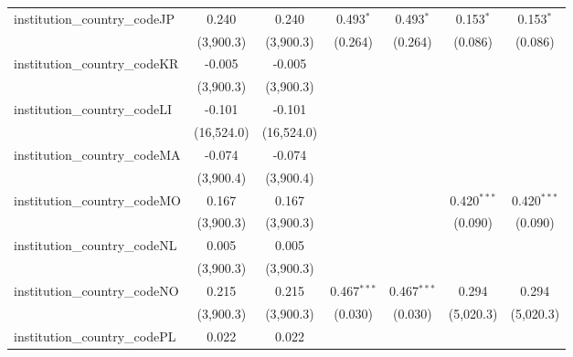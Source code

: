 \begin{tabular}{lcccccc}
   institution\_country\_codeJP          & 0.240          & 0.240          & 0.493$^{*}$   & 0.493$^{*}$   & 0.153$^{*}$    & 0.153$^{*}$\\   
                                         & (3,900.3)      & (3,900.3)      & (0.264)       & (0.264)       & (0.086)        & (0.086)\\   
   institution\_country\_codeKR          & -0.005         & -0.005         &               &               &                &   \\   
                                         & (3,900.3)      & (3,900.3)      &               &               &                &   \\   
   institution\_country\_codeLI          & -0.101         & -0.101         &               &               &                &   \\   
                                         & (16,524.0)     & (16,524.0)     &               &               &                &   \\   
   institution\_country\_codeMA          & -0.074         & -0.074         &               &               &                &   \\   
                                         & (3,900.4)      & (3,900.4)      &               &               &                &   \\   
   institution\_country\_codeMO          & 0.167          & 0.167          &               &               & 0.420$^{***}$  & 0.420$^{***}$\\   
                                         & (3,900.3)      & (3,900.3)      &               &               & (0.090)        & (0.090)\\   
   institution\_country\_codeNL          & 0.005          & 0.005          &               &               &                &   \\   
                                         & (3,900.3)      & (3,900.3)      &               &               &                &   \\   
   institution\_country\_codeNO          & 0.215          & 0.215          & 0.467$^{***}$ & 0.467$^{***}$ & 0.294          & 0.294\\   
                                         & (3,900.3)      & (3,900.3)      & (0.030)       & (0.030)       & (5,020.3)      & (5,020.3)\\   
   institution\_country\_codePL          & 0.022          & 0.022          &               &               &                &   \\   

\end{tabular}
